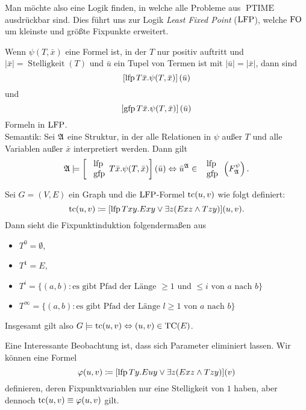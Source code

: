Man möchte also eine Logik finden, in welche alle Probleme aus $\operatorname{PTIME}$ ausdrückbar sind. Dies führt uns zur Logik \textit{Least Fixed Point} ($\operatorname{LFP}$), welche $\operatorname{FO}$ um kleinste und größte Fixpunkte erweitert.

Wenn $\psi(T,\bar{x})$ eine Formel ist, in der $T$ nur positiv auftritt und $\vert\bar{x}\vert = \operatorname{Stelligkeit}(T)$ und $\bar{u}$ ein Tupel von Termen ist mit $\vert\bar{u}\vert=\vert\bar{x}\vert$, dann sind
\[\left[ \operatorname{lfp} T\bar{x}.\psi(T, \bar{x})\right] (\bar{u})\]
und
\[\left[ \operatorname{gfp} T\bar{x}.\psi(T, \bar{x})\right] (\bar{u})\] 
Formeln in $\operatorname{LFP}$.
\\
Semantik: Sei $\mathfrak{A}$ eine Struktur, in der alle Relationen in $\psi$ außer $T$ und alle Variablen außer $\bar{x}$ interpretiert werden. Dann gilt
\[
\mathfrak{A}\models \left[\
\begin{array}{l}
	\operatorname{lfp} \\ \operatorname{gfp}
\end{array}
T \bar{x} . \psi(T,\bar{x}) \right](\bar{u}) \Leftrightarrow \bar{u}^{\mathfrak{A}} \in\
\begin{array}{l}
	\operatorname{lfp} \\ \operatorname{gfp}
\end{array}
\left( F^\psi_{\mathfrak{A}} \right).
\]

\begin{example}
	Sei $G=(V,E)$ ein Graph und die $\operatorname{LFP}$-Formel $\operatorname{tc}(u,v)$ wie folgt definiert:
	\[\operatorname{tc}(u,v)\coloneqq [\operatorname{lfp} T x y. Exy \lor \exists z(Exz \land Tzy)](u,v).\]
	Dann sieht die Fixpunktinduktion folgendermaßen aus
	\begin{itemize}
		\item $T^0=\emptyset$,
		\item $T^1=E$,
		\item $T^i=\{(a,b) : \text{es gibt Pfad der Länge } \geq 1 \text{ und } \leq i \text{ von } a \text{ nach } b\}$
		\item $T^\infty=\{(a,b) : \text{es gibt Pfad der Länge } l\geq 1 \text{ von } a \text{ nach } b\}$
	\end{itemize}
	Insgesamt gilt also $G\models\operatorname{tc}(u,v) \Leftrightarrow (u,v)\in \operatorname{TC}(E)$.
\end{example}

Eine Interessante Beobachtung ist, dass sich Parameter eliminiert lassen. Wir können eine Formel
\[\varphi(u,v) \coloneqq [\operatorname{lfp} T y. Euy \lor \exists z(Exz \land Tzy)](v)\]
definieren, deren Fixpunktvariablen nur eine Stelligkeit von $1$ haben, aber dennoch $\operatorname{tc}(u,v) \equiv \varphi(u,v)$ gilt.

